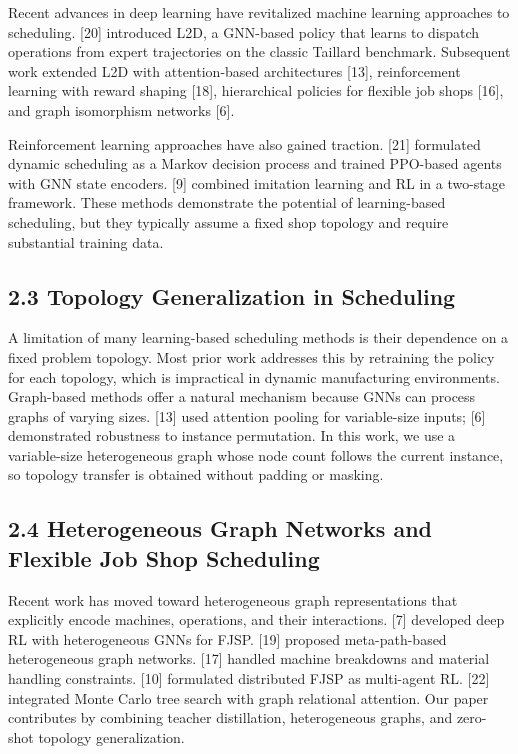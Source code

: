 \documentclass{article}
\begin{document}
Recent advances in deep learning have revitalized machine learning approaches to scheduling. {[}20{]} introduced L2D, a GNN-based policy that learns to dispatch operations from expert trajectories on the classic Taillard benchmark. Subsequent work extended L2D with attention-based architectures {[}13{]}, reinforcement learning with reward shaping {[}18{]}, hierarchical policies for flexible job shops {[}16{]}, and graph isomorphism networks {[}6{]}.

Reinforcement learning approaches have also gained traction. {[}21{]} formulated dynamic scheduling as a Markov decision process and trained PPO-based agents with GNN state encoders. {[}9{]} combined imitation learning and RL in a two-stage framework. These methods demonstrate the potential of learning-based scheduling, but they typically assume a fixed shop topology and require substantial training data.


\subsection*{2.3 Topology Generalization in Scheduling}

A limitation of many learning-based scheduling methods is their dependence on a fixed problem topology. Most prior work addresses this by retraining the policy for each topology, which is impractical in dynamic manufacturing environments. Graph-based methods offer a natural mechanism because GNNs can process graphs of varying sizes. {[}13{]} used attention pooling for variable-size inputs; {[}6{]} demonstrated robustness to instance permutation. In this work, we use a variable-size heterogeneous graph whose node count follows the current instance, so topology transfer is obtained without padding or masking.


\subsection*{2.4 Heterogeneous Graph Networks and Flexible Job Shop Scheduling}

Recent work has moved toward heterogeneous graph representations that explicitly encode machines, operations, and their interactions. {[}7{]} developed deep RL with heterogeneous GNNs for FJSP. {[}19{]} proposed meta-path-based heterogeneous graph networks. {[}17{]} handled machine breakdowns and material handling constraints. {[}10{]} formulated distributed FJSP as multi-agent RL. {[}22{]} integrated Monte Carlo tree search with graph relational attention. Our paper contributes by combining teacher distillation, heterogeneous graphs, and zero-shot topology generalization.
\end{document}
